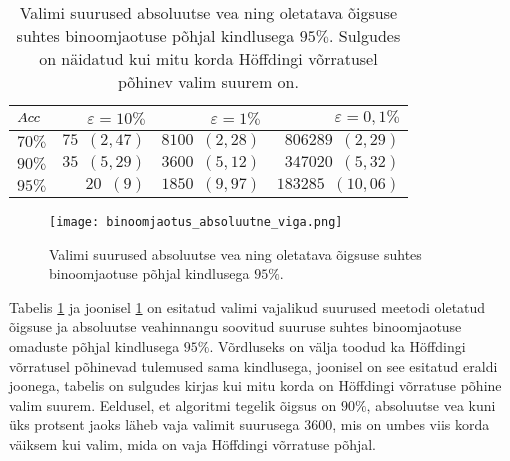 \begin{table}[H]
    \centering
    \caption{Valimi suurused absoluutse vea ning oletatava õigsuse suhtes binoomjaotuse põhjal kindlusega $95\%$. Sulgudes on näidatud kui mitu korda Höffdingi võrratusel põhinev valim suurem on.}
    \begin{tabular}{l | r r r}
        $Acc$ & $\varepsilon = 10\%$ & $\varepsilon = 1\%$ & $\varepsilon = 0,1\%$ \\
    	\hline
    	$70\%$ & $75\enspace(2{,}47)$ & $8100\enspace(2{,}28)$ & $806289\enspace(2{,}29)$ \\
    	$90\%$ & $35\enspace(5{,}29)$ & $3600\enspace(5{,}12)$ & $347020\enspace(5{,}32)$ \\
    	$95\%$ & $20\enspace(9)$      & $1850\enspace(9{,}97)$ & $183285\enspace(10{,}06)$ \\
    \end{tabular}
    \label{tab:binoomjaotus absoluutne viga}
\end{table}

\begin{figure}[H]
    \begin{center}
        \texttt{[image: binoomjaotus\_absoluutne\_viga.png]}
    \end{center}
    \caption{Valimi suurused absoluutse vea ning oletatava õigsuse suhtes binoomjaotuse põhjal kindlusega $95\%$.}
    \label{fig:binoomjaotus absoluutne viga}
\end{figure}

Tabelis \ref{tab:binoomjaotus absoluutne viga} ja joonisel \ref{fig:binoomjaotus absoluutne viga} on esitatud valimi vajalikud suurused meetodi oletatud õigsuse ja absoluutse veahinnangu soovitud suuruse suhtes binoomjaotuse omaduste põhjal kindlusega $95\%$. Võrdluseks on välja toodud ka Höffdingi võrratusel põhinevad tulemused sama kindlusega, joonisel on see esitatud eraldi joonega, tabelis on sulgudes kirjas kui mitu korda on Höffdingi võrratuse põhine valim suurem. Eeldusel, et algoritmi tegelik õigsus on $90\%$, absoluutse vea kuni üks protsent jaoks läheb vaja valimit suurusega $3600$, mis on umbes viis korda väiksem kui valim, mida on vaja Höffdingi võrratuse põhjal.

